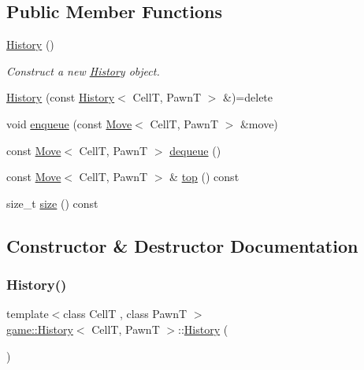 \subsection*{Public Member Functions}
\begin{DoxyCompactItemize}
\item 
\hyperlink{classgame_1_1_history_aa6430db00d18fea4105cfc70abe613c5}{History} ()
\begin{DoxyCompactList}\small\item\em Construct a new \hyperlink{classgame_1_1_history}{History} object. \end{DoxyCompactList}\item 
\hyperlink{classgame_1_1_history_a78704fa143785251e49eb67f0bea6d14}{History} (const \hyperlink{classgame_1_1_history}{History}$<$ CellT, PawnT $>$ \&)=delete
\item 
void \hyperlink{classgame_1_1_history_a9bbe268b150e8ae99e483fb53fca06fa}{enqueue} (const \hyperlink{structgame_1_1_move}{Move}$<$ CellT, PawnT $>$ \&move)
\item 
const \hyperlink{structgame_1_1_move}{Move}$<$ CellT, PawnT $>$ \hyperlink{classgame_1_1_history_aee23b3221bfdb6b373cac8692b8cfb20}{dequeue} ()
\item 
const \hyperlink{structgame_1_1_move}{Move}$<$ CellT, PawnT $>$ \& \hyperlink{classgame_1_1_history_aae955cf1457fcee4031d0dd6aac480aa}{top} () const
\item 
size\+\_\+t \hyperlink{classgame_1_1_history_a76232fe6378cb99627bf3836bb49b2f9}{size} () const
\end{DoxyCompactItemize}


\subsection{Constructor \& Destructor Documentation}
\mbox{\label{classgame_1_1_history_aa6430db00d18fea4105cfc70abe613c5}} 
\subsubsection{\texorpdfstring{History()}{History()}\hspace{0.1cm}{\footnotesize\ttfamily [1/2]}}
{\footnotesize\ttfamily template$<$class CellT , class PawnT $>$ \\
\hyperlink{classgame_1_1_history}{game\+::\+History}$<$ CellT, PawnT $>$\+::\hyperlink{classgame_1_1_history}{History} (\begin{DoxyParamCaption}{ }\end{DoxyParamCaption})}



